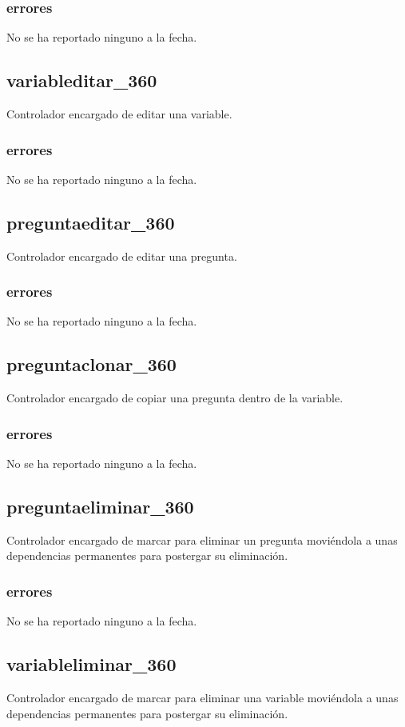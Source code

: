\documentclass[10pt,a4paper]{book}
\begin{document}
	\subsubsection{errores}
	No se ha reportado ninguno a la fecha.
	
	\subsection{variableditar\_360}
	Controlador encargado de editar una variable.
	\subsubsection{errores}
	No se ha reportado ninguno a la fecha.
	
	\subsection{preguntaeditar\_360}
	Controlador encargado de editar una pregunta.
	\subsubsection{errores}
	No se ha reportado ninguno a la fecha.
	
	\subsection{preguntaclonar\_360}
	Controlador encargado de copiar una pregunta dentro de la variable.
	\subsubsection{errores}
	No se ha reportado ninguno a la fecha.
	
	\subsection{preguntaeliminar\_360}
	Controlador encargado de marcar para eliminar un pregunta moviéndola a unas dependencias permanentes para postergar su eliminación.
	\subsubsection{errores}
	No se ha reportado ninguno a la fecha.
	
	\subsection{variableliminar\_360}
	Controlador encargado de marcar para eliminar una variable moviéndola a unas dependencias permanentes para postergar su eliminación.
\end{document}
